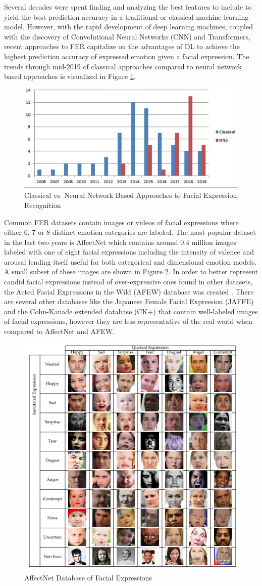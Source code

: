     Several decades were spent finding and analyzing the best features to include to yield the best prediction accuracy in a traditional or classical machine learning model. However, with the rapid development of deep learning machines, coupled with the discovery of Convolutional Neural Networks (CNN) and Transformers, recent approaches to FER capitalize on the advantages of DL to achieve the highest prediction accuracy of expressed emotion given a facial expression. The trends through mid-2019 of classical approaches compared to neural network based approaches is visualized in Figure \ref{fig:trad_vs_nn}.
        
    \begin{figure}[!htb]
    \centering
    \includegraphics[width=.5\textwidth]{figures/trad_vs_nn.jpg}
    \caption{\label{fig:trad_vs_nn} Classical vs. Neural Network Based Approaches to Facial Expression Recognition \cite{canal-2022}}
    \end{figure} 

     Common FER datasets contain images or videos of facial expressions where either 6, 7 or 8 distinct emotion categories are labeled. The most popular dataset in the last two years is AffectNet \cite{mollahosseini_affectnet_2019} which contains around 0.4 million images labeled with one of eight facial expressions including the intensity of valence and arousal lending itself useful for both categorical and dimensional emotion models. A small subset of these images are shown in Figure \ref{fig:fer}. In order to better represent candid facial expressions instead of over-expressive ones found in other datasets, the Acted Facial Expressions in the Wild (AFEW) database was created \cite{dhall}. There are several other databases like the Japanese Female Facial Expression (JAFFE) \cite{lyons} and the Cohn-Kanade extended database (CK+) \cite{lucey} that contain well-labeled images of facial expressions, however they are less representative of the real world when compared to AffectNet and AFEW. 
    
    \begin{figure}[!htb]
    \centering
    \includegraphics[width=.3\textwidth]{figures/faces.png}
    \caption{\label{fig:fer} AffectNet Database of Facial Expressions \cite{mollahosseini_affectnet_2019}}
    \end{figure}

